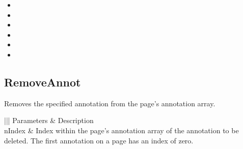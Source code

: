 \documentclass[letterpaper,12pt,english,openany,oneside]{sphinxmanual}
\begin{document}
\label{\detokenize{IAC_API_OLE_Objects:related-methods-126}}
\begin{itemize}
\item {} 
 

\item {} 
 

\item {} 
 

\item {} 
 

\item {} 
 

\item {} 
 

\end{itemize}




\subsection{RemoveAnnot}
\label{\detokenize{IAC_API_OLE_Objects:removeannot}}
Removes the specified annotation from the page’s annotation array.


\begin{sphinxVerbatim}[commandchars=\\\{\}]
  
\end{sphinxVerbatim}
\label{\detokenize{IAC_API_OLE_Objects:parameters-77}}


\begin{savenotes}\sphinxattablestart
\centering
{}\label{\detokenize{IAC_API_OLE_Objects:section-86}}\nobreak
\begin{tabular}[t]{|||}
\hline
\sphinxstyletheadfamily 
Parameters
&\sphinxstyletheadfamily 
Description
\\
\hline
nIndex
&
Index within the page’s annotation array of the annotation to be deleted. The first annotation on a page has an index of zero.
\\
\hline
\end{tabular}
\par
\sphinxattableend\end{savenotes}
\end{document}
